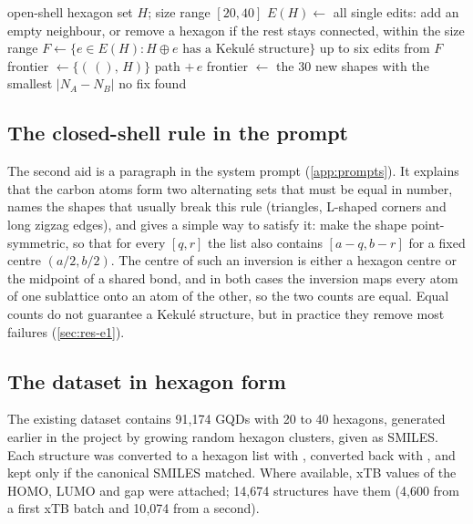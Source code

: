 \begin{algorithm}[ht]
  \caption{Fix edits for an open-shell design ()}
  \label{alg:fixes}
  \begin{algorithmic}[1]
    \Require open-shell hexagon set \(H\); size range \([20,40]\)
    \State \(E(H) \gets\) all single edits: add an empty neighbour, or remove a hexagon if the rest
           stays connected, within the size range
    \State \(F \gets \{e \in E(H) : H \oplus e \text{ has a Kekul\'e structure}\}\)
      \State \Return up to six edits from \(F\)
    \EndIf
    \State frontier \(\gets \{(\,(),\,H)\}\)
          \State \Return path \(+\,e\)
        \EndIf
      \EndFor
      \State frontier \(\gets\) the 30 new shapes with the smallest \(|N_A - N_B|\)
    \EndFor
    \State \Return no fix found
  \end{algorithmic}
\end{algorithm}

\subsection{The closed-shell rule in the prompt}
\label{sec:rule-prompt}

The second aid is a paragraph in the system prompt (\cref{app:prompts}). It explains that the
carbon atoms form two alternating sets that must be equal in number, names the shapes that usually
break this rule (triangles, L-shaped corners and long zigzag edges), and gives a simple way to
satisfy it: make the shape point-symmetric, so that for every \([q,r]\) the list also contains
\([a-q,b-r]\) for a fixed centre \((a/2,b/2)\). The centre of such an inversion is either a hexagon
centre or the midpoint of a shared bond, and in both cases the inversion maps every atom of one
sublattice onto an atom of the other, so the two counts are equal. Equal counts do not guarantee a
Kekul\'e structure, but in practice they remove most failures (\cref{sec:res-e1}).

\subsection{The dataset in hexagon form}

The existing dataset contains 91{,}174 GQDs with 20 to 40 hexagons, generated earlier in the
project by growing random hexagon clusters, given as SMILES. Each structure was converted to a
hexagon list with , converted back with , and kept only if
the canonical SMILES matched. Where available, xTB values of the HOMO, LUMO and gap were attached;
14{,}674 structures have them (4{,}600 from a first xTB batch and 10{,}074 from a second).

